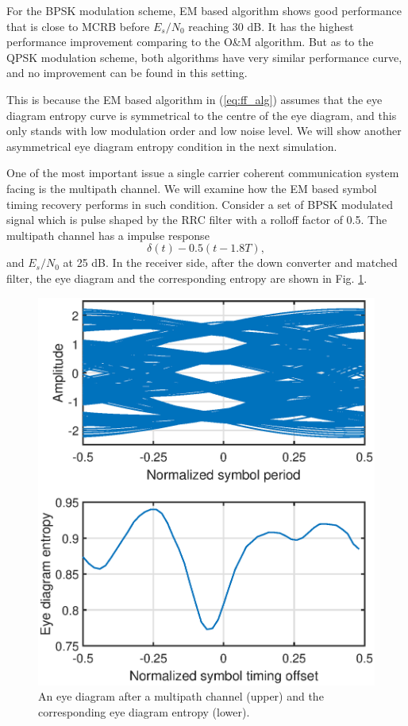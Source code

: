 \documentclass[journal,comsoc]{IEEEtran}
\begin{document}
For the BPSK modulation scheme, EM based algorithm shows good performance that is close to MCRB before \(E_s/N_0\) reaching 30 dB.
It has the highest performance improvement comparing to the O\&M algorithm.
But as to the QPSK modulation scheme, both algorithms have very similar performance curve, and no improvement can be found in this setting.

This is because the EM based algorithm in (\ref{eq:ff_alg}) assumes that the eye diagram entropy curve is symmetrical to the centre of the eye diagram, and this only stands with low modulation order and low noise level.
We will show another asymmetrical eye diagram entropy condition in the next simulation. 

One of the most important issue a single carrier coherent communication system facing is the multipath channel.
We will examine how the EM based symbol timing recovery performs in such condition.
Consider a set of BPSK modulated signal which is pulse shaped by the RRC filter with  a rolloff factor of 0.5.
The multipath channel has a impulse response
\begin{equation}
\delta(t)-0.5(t-1.8T),
\end{equation}
and \(E_s/N_0\) at 25 dB.  
In the receiver side, after the down converter and matched filter, the eye diagram and the corresponding entropy are shown in Fig. \ref{fig:per_timing_isi}. 
\begin{figure}[ht]
\centering
\includegraphics[width=3 in]{pic/per_timing_multi.eps}
\caption{An eye diagram after a multipath channel (upper) and the corresponding eye diagram entropy (lower).}
\label{fig:per_timing_isi} 
\end{figure} 
\end{document}
